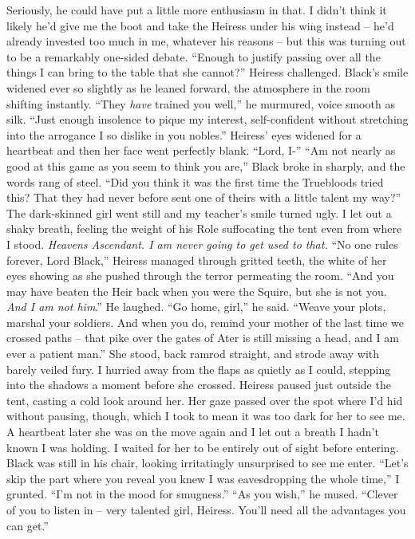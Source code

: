 \documentclass[12pt, openany]{book}
\begin{document}
Seriously, he could have put a little more enthusiasm in that. I didn’t think it likely he’d give me the boot and take the Heiress under his wing instead – he’d already invested too much in me, whatever his reasons – but this was turning out to be a remarkably one-sided debate.
“Enough to justify passing over all the things I can bring to the table that she cannot?” Heiress challenged.
Black’s smile widened ever so slightly as he leaned forward, the atmosphere in the room shifting instantly.
“They \textit{have} trained you well,” he murmured, voice smooth as silk. “Just enough insolence to pique my interest, self-confident without stretching into the arrogance I so dislike in you nobles.”
Heiress’ eyes widened for a heartbeat and then her face went perfectly blank.
“Lord, I-”
“Am not nearly as good at this game as you seem to think you are,” Black broke in sharply, and the words rang of steel. “Did you think it was the first time the Truebloods tried this? That they had never before sent one of theirs with a little talent my way?”
The dark-skinned girl went still and my teacher’s smile turned ugly. I let out a shaky breath, feeling the weight of his Role suffocating the tent even from where I stood. \textit{Heavens Ascendant. I am never going to get used to that.}
“No one rules forever, Lord Black,” Heiress managed through gritted teeth, the white of her eyes showing as she pushed through the terror permeating the room. “And you may have beaten the Heir back when you were the Squire, but she is not you. \textit{And I am not him}.”
He laughed.
“Go home, girl,” he said. “Weave your plots, marshal your soldiers. And when you do, remind your mother of the last time we crossed paths – that pike over the gates of Ater is still missing a head, and I am ever a patient man.”
She stood, back ramrod straight, and strode away with barely veiled fury. I hurried away from the flaps as quietly as I could, stepping into the shadows a moment before she crossed. Heiress paused just outside the tent, casting a cold look around her. Her gaze passed over the spot where I’d hid without pausing, though, which I took to mean it was too dark for her to see me. A heartbeat later she was on the move again and I let out a breath I hadn’t known I was holding. I waited for her to be entirely out of sight before entering. Black was still in his chair, looking irritatingly unsurprised to see me enter.
“Let’s skip the part where you reveal you knew I was eavesdropping the whole time,” I grunted. “I’m not in the mood for smugness.”
“As you wish,” he mused. “Clever of you to listen in – very talented girl, Heiress. You’ll need all the advantages you can get.”
\end{document}
